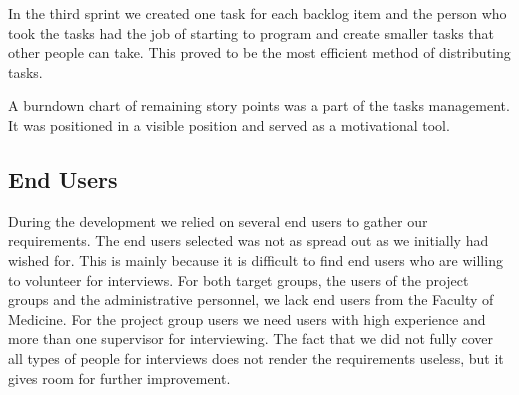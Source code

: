 In the third sprint we created one task for each backlog item and the person who took the tasks had the job of starting to program and create smaller tasks that other people can take. 
This proved to be the most efficient method of distributing tasks.

A burndown chart of remaining story points was a part of the tasks management.
It was positioned in a visible position and served as a motivational tool.


\subsection{End Users}
During the development we relied on several end users to gather our requirements.
The end users selected was not as spread out as we initially had wished for. 
This is mainly because it is difficult to find end users who are willing to volunteer for interviews. 
For both target groups, the users of the project groups and the administrative personnel, we lack end users from the Faculty of Medicine.
For the project group users we need users with high experience and more than one supervisor for interviewing. 
The fact that we did not fully cover all types of people for interviews does not render the requirements useless, but it gives room for further improvement.